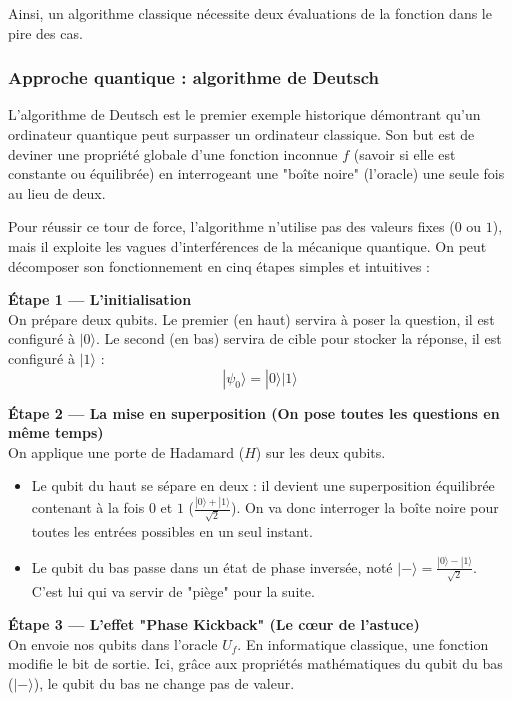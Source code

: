 \documentclass[a4paper,12pt]{article}
\begin{document}
Ainsi, un algorithme classique nécessite deux évaluations de la fonction dans le pire des cas.

\subsubsection{Approche quantique : algorithme de Deutsch}

L’algorithme de Deutsch est le premier exemple historique démontrant qu'un ordinateur quantique peut surpasser un ordinateur classique. Son but est de deviner une propriété globale d'une fonction inconnue $f$ (savoir si elle est constante ou équilibrée) en interrogeant une "boîte noire" (l'oracle) une seule fois au lieu de deux.

Pour réussir ce tour de force, l'algorithme n'utilise pas des valeurs fixes ($0$ ou $1$), mais il exploite les vagues d'interférences de la mécanique quantique. On peut décomposer son fonctionnement en cinq étapes simples et intuitives :

\medskip
\textbf{Étape 1 — L'initialisation} \\
On prépare deux qubits. Le premier (en haut) servira à poser la question, il est configuré à $|0\rangle$. Le second (en bas) servira de cible pour stocker la réponse, il est configuré à $|1\rangle$ :
\[
|\psi_0\rangle = |0\rangle|1\rangle
\]

\medskip
\textbf{Étape 2 — La mise en superposition (On pose toutes les questions en même temps)} \\
On applique une porte de Hadamard ($H$) sur les deux qubits. 
\begin{itemize}
    \item Le qubit du haut se sépare en deux : il devient une superposition équilibrée contenant à la fois $0$ et $1$ ($\frac{|0\rangle+|1\rangle}{\sqrt{2}}$). On va donc interroger la boîte noire pour toutes les entrées possibles en un seul instant.
    \item Le qubit du bas passe dans un état de phase inversée, noté $|-\rangle = \frac{|0\rangle-|1\rangle}{\sqrt{2}}$. C'est lui qui va servir de "piège" pour la suite.
\end{itemize}

\medskip
\textbf{Étape 3 — L'effet "Phase Kickback" (Le cœur de l'astuce)} \\
On envoie nos qubits dans l'oracle $U_f$. En informatique classique, une fonction modifie le bit de sortie. Ici, grâce aux propriétés mathématiques du qubit du bas ($|-\rangle$), le qubit du bas ne change pas de valeur. 
\end{document}
